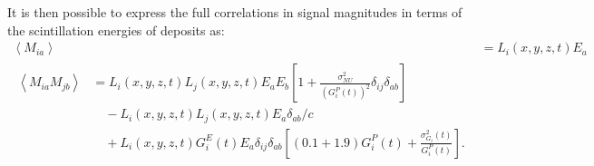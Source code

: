 It is then possible to express the full correlations in signal magnitudes in terms of the scintillation energies of deposits as:
\begin{align*}
\left< M_{ia} \right> &= L_i(x,y,z,t) E_a \\
\begin{split}
\left< M_{ia} M_{jb} \right> &= L_i(x,y,z,t)L_j(x,y,z,t) E_a E_b \left[1 + \frac{\sigma^2_{NU}}{\left(G^P_i(t)\right)^2} \delta_{ij}\delta_{ab} \right] \\
&\quad - L_i(x,y,z,t) L_j(x,y,z,t) E_a \delta_{ab}/c \\
&\quad + L_i(x,y,z,t) G^E_i(t) E_a \delta_{ij} \delta_{ab} \left[\left(0.1 + 1.9\right)G^P_i(t) + \frac{\sigma^2_{G_i}(t)}{G^P_i(t)}\right].
\end{split}\end{align*}

